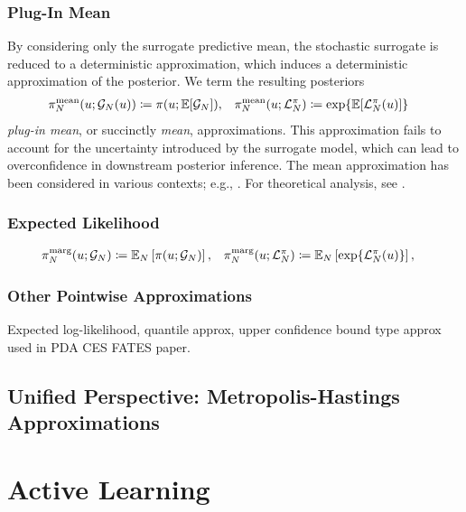 \documentclass[12pt]{article}
\begin{document}
\subsubsection{Plug-In Mean}
By considering only the surrogate predictive mean, the stochastic surrogate is reduced 
to a deterministic approximation, which induces a deterministic approximation of the 
posterior. We term the resulting posteriors
\begin{align}
&\llikEmMeanDens[\Ndesign](\Par; \fwdEm[\Ndesign](\Par)) \Def \postDens(\Par; \E[\fwdEm[\Ndesign]]),
&&\llikEmMeanDens[\Ndesign](\Par; \lpostEm[\Ndesign]) \Def \Exp{\E[\lpostEm[\Ndesign](\Par)]}
\end{align}
\textit{plug-in mean}, or succinctly \textit{mean}, approximations. This approximation fails to account 
for the uncertainty introduced by the surrogate model, which can lead to overconfidence in downstream
posterior inference. The mean approximation has been considered in various contexts; e.g., 
\citep{VehtariParallelGP,trainDynamics}.
For theoretical analysis, see 
\citep{StuartTeck1,StuartTeck2,random_fwd_models,TeckHyperpar,gp_surrogates_random_exploration}.
 
\subsubsection{Expected Likelihood}


\begin{align}
&\llikEmMargDens[\Ndesign](\Par; \fwdEm[\Ndesign]) \Def \E_{\Ndesign}\left[\postDens(\Par; \fwdEm[\Ndesign])\right],
&&\llikEmMargDens[\Ndesign](\Par; \lpostEm[\Ndesign]) \Def \E_{\Ndesign}\left[\Exp{\lpostEm[\Ndesign](\Par)}\right],
\end{align}

\subsubsection{Other Pointwise Approximations}
Expected log-likelihood, quantile approx, upper confidence bound type approx used in PDA CES FATES paper.

\subsection{Unified Perspective: Metropolis-Hastings Approximations}


\section{Active Learning} \label{sec:active_learning}
\end{document}
